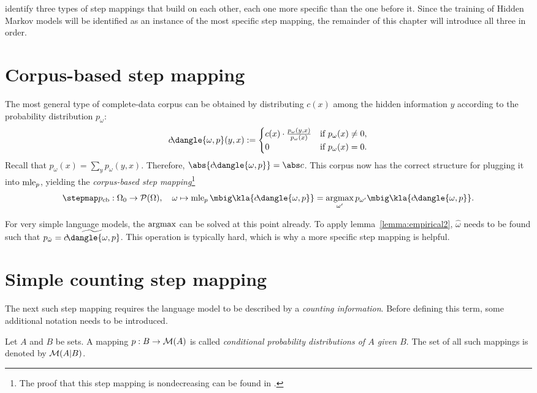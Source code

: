 \cite{bucstuvog15} identify three types of step mappings that build on each
other, each one more specific than the one before it. Since the training of
Hidden Markov models will be identified as an instance of the most specific
step mapping, the remainder of this chapter will introduce all three in order.

\section{Corpus-based step mapping}

The most general type of complete-data corpus can be obtained by distributing
$c(x)$ among the hidden information $y$ according to the probability
distribution $p_\omega$:
\[
 c\!\dangle{\omega,p}(y,x) := \begin{cases}
  c(x) \cdot \frac{p_\omega(y,x)}{p_\omega(x)} & \text{if } p_\omega(x) \neq 0, \\
  0 & \text{if } p_\omega(x) = 0.
 \end{cases}
\]
Recall that $p_\omega(x) = \sum_y p_\omega(y,x)$. Therefore,
$\abs{c\!\dangle{\omega,p}} = \abs c$. This corpus now has the correct
structure for plugging it into $\operatorname{mle}_p$, yielding the \emph{corpus-based step
mapping}\footnote{The proof that this step mapping is nondecreasing can be
found in \cite[pp.~10]{bucstuvog15}.}
\[
 \stepmap p_\mathrm{cb}: \Omega_0\to\up(\Omega),
 \quad
 \omega \mapsto \mle_p\mbig\kla{c\!\dangle{\omega,p}} = \argmax_{\omega'} p_{\omega'}\mbig\kla{c\!\dangle{\omega,p}}.
\]

For very simple language models, the $\argmax$ can be solved at this point
already. To apply lemma~\ref{lemma:empirical2}, $\hat\omega$ needs to be found
such that $p_{\hat\omega} = \widetilde{c\!\dangle{\omega,p}}$. This operation
is typically hard, which is why a more specific step mapping is helpful.

\section{Simple counting step mapping}

The next such step mapping requires the language model to be described by a
\emph{counting information}. Before defining this term, some additional
notation needs to be introduced.

\begin{definition}
 Let $A$ and $B$ be sets. A mapping $p: B \to \mathcal M(A)$ is called
 \emph{conditional probability distributions of $A$ given $B$}. The set of all
 such mappings is denoted by $\mathcal M(A|B)$.
\end{definition}


